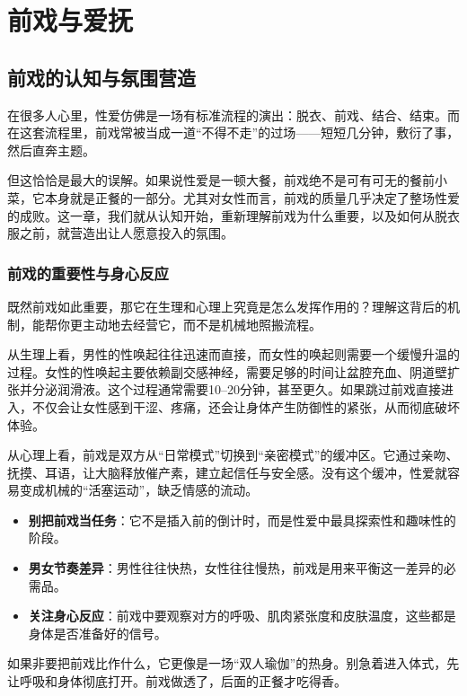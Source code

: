 \documentclass[12pt,UTF8]{ctexbook}
\begin{document}
\part{前戏与爱抚}

\chapter{前戏的认知与氛围营造}

在很多人心里，性爱仿佛是一场有标准流程的演出：脱衣、前戏、结合、结束。而在这套流程里，前戏常被当成一道“不得不走”的过场——短短几分钟，敷衍了事，然后直奔主题。

但这恰恰是最大的误解。如果说性爱是一顿大餐，前戏绝不是可有可无的餐前小菜，它本身就是正餐的一部分。尤其对女性而言，前戏的质量几乎决定了整场性爱的成败。这一章，我们就从认知开始，重新理解前戏为什么重要，以及如何从脱衣服之前，就营造出让人愿意投入的氛围。

\section{前戏的重要性与身心反应}

既然前戏如此重要，那它在生理和心理上究竟是怎么发挥作用的？理解这背后的机制，能帮你更主动地去经营它，而不是机械地照搬流程。

从生理上看，男性的性唤起往往迅速而直接，而女性的唤起则需要一个缓慢升温的过程。女性的性唤起主要依赖副交感神经，需要足够的时间让盆腔充血、阴道壁扩张并分泌润滑液。这个过程通常需要10--20分钟，甚至更久。如果跳过前戏直接进入，不仅会让女性感到干涩、疼痛，还会让身体产生防御性的紧张，从而彻底破坏体验。

从心理上看，前戏是双方从“日常模式”切换到“亲密模式”的缓冲区。它通过亲吻、抚摸、耳语，让大脑释放催产素，建立起信任与安全感。没有这个缓冲，性爱就容易变成机械的“活塞运动”，缺乏情感的流动。

\begin{itemize}
\item \textbf{别把前戏当任务}：它不是插入前的倒计时，而是性爱中最具探索性和趣味性的阶段。
\item \textbf{男女节奏差异}：男性往往快热，女性往往慢热，前戏是用来平衡这一差异的必需品。
\item \textbf{关注身心反应}：前戏中要观察对方的呼吸、肌肉紧张度和皮肤温度，这些都是身体是否准备好的信号。
\end{itemize}

\begin{tcolorbox}[colback=pink!5!white,colframe=red!50!black,title=贴心小叮咛]
如果非要把前戏比作什么，它更像是一场“双人瑜伽”的热身。别急着进入体式，先让呼吸和身体彻底打开。前戏做透了，后面的正餐才吃得香。
\end{tcolorbox}
\end{document}
